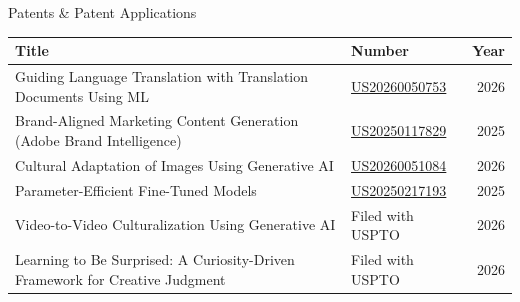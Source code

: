 \documentclass{resume}
\begin{document}

\begin{rSection}{Patents \& Patent Applications}
\begin{tabular*}{\linewidth}{@{}l@{\extracolsep{\fill}}lr@{}}
\textbf{Title} & \textbf{Number} & \textbf{Year} \\
\hline
Guiding Language Translation with Translation Documents Using ML & \href{https://patents.google.com/patent/US20260050753A1/en}{US20260050753} & 2026 \\
Brand-Aligned Marketing Content Generation (Adobe Brand Intelligence) & \href{https://patents.google.com/patent/US20250117829A1/en}{US20250117829} & 2025 \\
Cultural Adaptation of Images Using Generative AI & \href{https://patents.google.com/patent/US20260051084A1/en}{US20260051084} & 2026 \\
Parameter-Efficient Fine-Tuned Models & \href{https://patents.google.com/patent/US20250217193A1/en}{US20250217193} & 2025 \\
Video-to-Video Culturalization Using Generative AI & Filed with USPTO & 2026 \\
Learning to Be Surprised: A Curiosity-Driven Framework for Creative Judgment & Filed with USPTO & 2026 \\
\end{tabular*}
\end{rSection}

\end{document}
